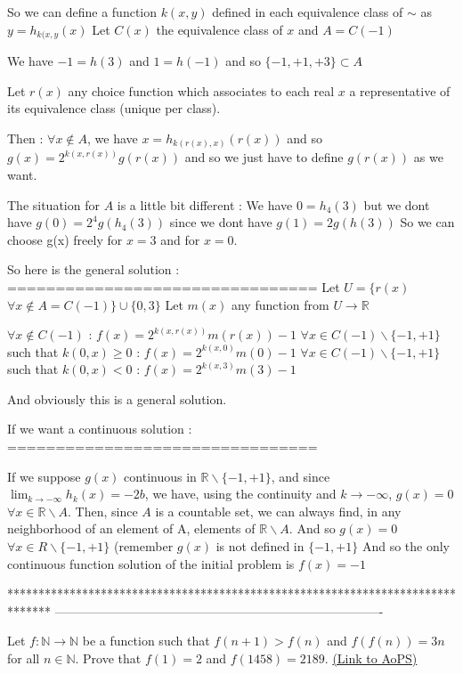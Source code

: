 \begin{solution}
So we can define a function $ k(x,y)$ defined in each equivalence class of $ \sim$ as $ y = h_{k(x,y}(x)$
Let $ C(x)$ the equivalence class of $ x$ and $ A = C( - 1)$

We have $ - 1 = h(3)$ and $ 1 = h( - 1)$ and so $ \{ - 1, + 1, + 3\}\subset A$

Let $ r(x)$ any choice function which associates to each real $ x$ a representative of its equivalence class (unique per class).

Then :
$ \forall x\notin A$, we have $ x = h_{k(r(x),x)}(r(x))$ and so $ g(x) = 2^{k(x,r(x))}g(r(x))$ and so we just have to define $ g(r(x))$ as we want.

The situation for $ A$ is a little bit different :
We have $ 0 = h_4(3)$ but we dont have $ g(0) = 2^4g(h_4(3))$ since we dont have $ g(1) = 2g(h(3))$
So we can choose g(x) freely for $ x = 3$ and for $ x = 0$.

So here is the general solution :
================================
Let $ U = \{r(x)$ $ \forall x\notin A = C( - 1)\}\cup\{0,3\}$
Let $ m(x)$ any function from $ U\to\mathbb R$

$ \forall x\notin C( - 1)$ : $ f(x) = 2^{k(x,r(x))}m(r(x)) - 1$
$ \forall x\in C( - 1)\backslash\{ - 1, + 1\}$ such that $ k(0,x)\geq 0$ : $ f(x) = 2^{k(x,0)}m(0) - 1$
$ \forall x\in C( - 1)\backslash\{ - 1, + 1\}$ such that $ k(0,x) < 0$ : $ f(x) = 2^{k(x,3)}m(3) - 1$

And obviously this is a general solution.

If we want a continuous solution :
================================

If we suppose $ g(x)$ continuous in $ \mathbb R\backslash\{ - 1, + 1\}$, and since $ \lim_{k\to - \infty}h_k(x) = -2b$, we have, using the continuity and $ k\to - \infty$, $ g(x) = 0$ $ \forall x\in\mathbb R\backslash A$. Then, since $ A$ is a countable set, we can always find, in any neighborhood of an element of A, elements of $ \mathbb R\backslash A$. And so $ g(x) = 0$ $ \forall x\in R\backslash\{ - 1, + 1\}$ (remember $ g(x)$ is not defined in $ \{ - 1, + 1\}$ And so the only continuous function solution of the initial problem is $ f(x) = - 1$
\end{solution}
*******************************************************************************
-------------------------------------------------------------------------------

\begin{problem}
	Let $ f : \mathbb{N}\rightarrow \mathbb{N}$ be a function such that $ f(n + 1) > f(n)$ and $ f(f(n)) = 3n$ for all $n \in \mathbb N$. Prove that $ f(1) = 2$ and $ f(1458) = 2189$.
	\flushright \href{https://artofproblemsolving.com/community/c6h276200}{(Link to AoPS)}
\end{problem}



